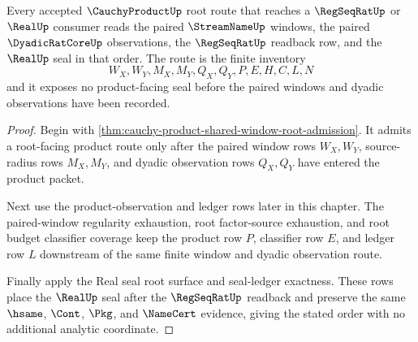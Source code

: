 \begin{theorem}
\label{thm:cauchyproduct-root-window-regseqrat-seal-route}
Every accepted $\CauchyProductUp$ root route that reaches a $\RegSeqRatUp$ or $\RealUp$ consumer reads the paired $\StreamNameUp$ windows, the paired $\DyadicRatCoreUp$ observations, the $\RegSeqRatUp$ readback row, and the $\RealUp$ seal in that order. The route is the finite inventory
$$
W_X,W_Y,M_X,M_Y,Q_X,Q_Y,P,E,H,C,L,N
$$
and it exposes no product-facing seal before the paired windows and dyadic observations have been recorded.
\end{theorem}
\begin{proof}
Begin with \autoref{thm:cauchy-product-shared-window-root-admission}. It admits a root-facing product route only after the paired window rows $W_X,W_Y$, source-radius rows $M_X,M_Y$, and dyadic observation rows $Q_X,Q_Y$ have entered the product packet.

Next use the product-observation and ledger rows later in this chapter. The paired-window regularity exhaustion, root factor-source exhaustion, and root budget classifier coverage keep the product row $P$, classifier row $E$, and ledger row $L$ downstream of the same finite window and dyadic observation route.

Finally apply the Real seal root surface and seal-ledger exactness. These rows place the $\RealUp$ seal after the $\RegSeqRatUp$ readback and preserve the same $\hsame$, $\Cont$, $\Pkg$, and $\NameCert$ evidence, giving the stated order with no additional analytic coordinate.
\end{proof}

